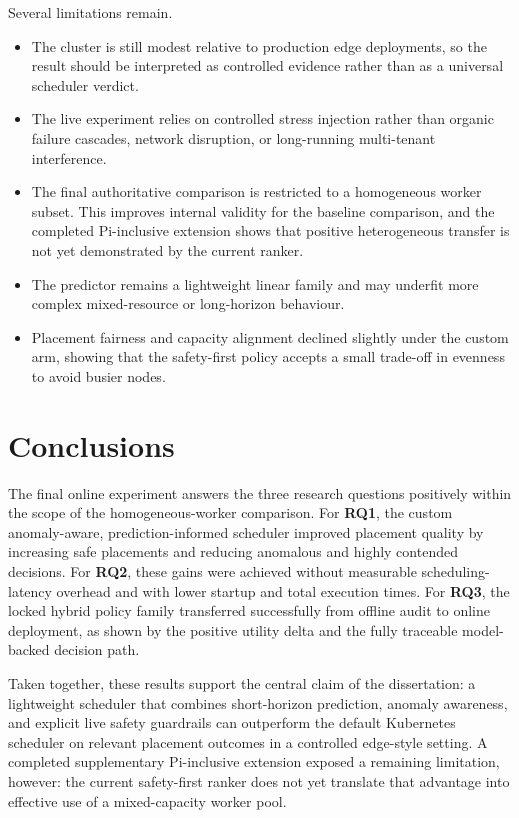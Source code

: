 Several limitations remain.

\begin{itemize}
\item The cluster is still modest relative to production edge deployments, so the result should be interpreted as controlled evidence rather than as a universal scheduler verdict.
\item The live experiment relies on controlled stress injection rather than organic failure cascades, network disruption, or long-running multi-tenant interference.
\item The final authoritative comparison is restricted to a homogeneous worker subset. This improves internal validity for the baseline comparison, and the completed Pi-inclusive extension shows that positive heterogeneous transfer is not yet demonstrated by the current ranker.
\item The predictor remains a lightweight linear family and may underfit more complex mixed-resource or long-horizon behaviour.
\item Placement fairness and capacity alignment declined slightly under the custom arm, showing that the safety-first policy accepts a small trade-off in evenness to avoid busier nodes.
\end{itemize}


\section{Conclusions}
\label{sec:conclusions}

The final online experiment answers the three research questions positively within the scope of the homogeneous-worker comparison. For \textbf{RQ1}, the custom anomaly-aware, prediction-informed scheduler improved placement quality by increasing safe placements and reducing anomalous and highly contended decisions. For \textbf{RQ2}, these gains were achieved without measurable scheduling-latency overhead and with lower startup and total execution times. For \textbf{RQ3}, the locked hybrid policy family transferred successfully from offline audit to online deployment, as shown by the positive utility delta and the fully traceable model-backed decision path.

Taken together, these results support the central claim of the dissertation: a lightweight scheduler that combines short-horizon prediction, anomaly awareness, and explicit live safety guardrails can outperform the default Kubernetes scheduler on relevant placement outcomes in a controlled edge-style setting. A completed supplementary Pi-inclusive extension exposed a remaining limitation, however: the current safety-first ranker does not yet translate that advantage into effective use of a mixed-capacity worker pool.


